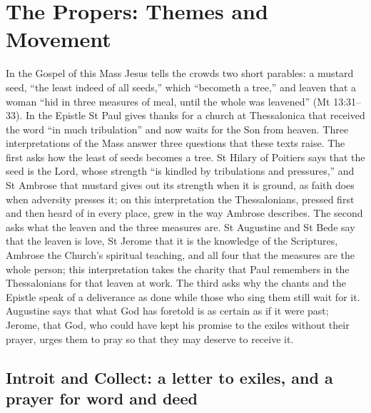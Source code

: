 
\section{The Propers: Themes and Movement}

In the Gospel of this Mass Jesus tells the crowds two short parables: a
mustard seed, ``the least indeed of all seeds,'' which ``becometh a tree,'' and
leaven that a woman ``hid in three measures of meal, until the whole was
leavened'' (Mt 13:31--33). In the Epistle St Paul gives thanks for a church at
Thessalonica that received the word ``in much tribulation'' and now waits for
the Son from heaven. Three interpretations of the Mass answer three questions
that these texts raise. The first asks how the least of seeds becomes a tree.
St Hilary of Poitiers says that the seed is the Lord, whose strength ``is
kindled by tribulations and pressures,'' and St Ambrose that mustard gives out
its strength when it is ground, as faith does when adversity presses it; on
this interpretation the Thessalonians, pressed first and then heard of in
every place, grew in the way Ambrose describes. The second asks what the leaven
and the three measures are. St Augustine and St Bede say that the leaven is
love, St Jerome that it is the knowledge of the Scriptures, Ambrose the
Church's spiritual teaching, and all four that the measures are the whole person; this
interpretation takes the charity that Paul remembers in the Thessalonians for
that leaven at work. The third asks why the chants and the Epistle speak of a
deliverance as done while those who sing them still wait for it. Augustine
says that what God has foretold is as certain as if it were past; Jerome, that
God, who could have kept his promise to the exiles without their prayer, urges
them to pray so that they may deserve to receive it.

\subsection{Introit and Collect: a letter to exiles, and a prayer for word and deed}

